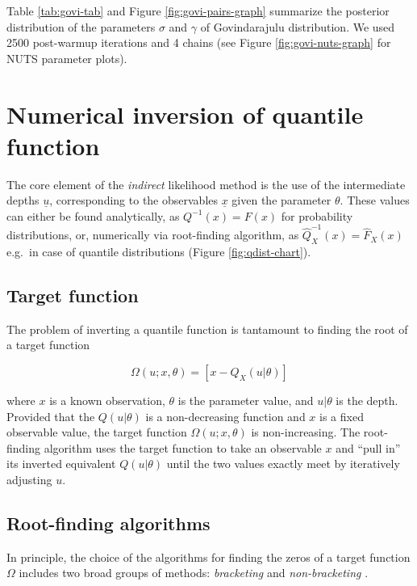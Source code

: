 \documentclass[
  12pt,
]{article}
\begin{document}
Table \ref{tab:govi-tab} and Figure \ref{fig:govi-pairs-graph} summarize the posterior distribution of the parameters \(\sigma\) and \(\gamma\) of Govindarajulu distribution. We used 2500 post-warmup iterations and 4 chains (see Figure \ref{fig:govi-nuts-graph} for NUTS parameter plots).

\hypertarget{numerical-inversion-of-quantile-function}{%
\section{Numerical inversion of quantile function}\label{numerical-inversion-of-quantile-function}}

The core element of the \emph{indirect} likelihood method is the use of the intermediate depths \(\underline{u}\), corresponding to the observables \(\underline{x}\) given the parameter \(\theta\). These values can either be found analytically, as \(Q^{-1}(x)=F(x)\) for probability distributions, or, numerically via root-finding algorithm, as \(\widehat{Q}^{-1}_X(x)=\widehat{F}_X(x)\) e.g.~in case of quantile distributions (Figure \ref{fig:qdist-chart}).

\hypertarget{target-function}{%
\subsection{Target function}\label{target-function}}

The problem of inverting a quantile function is tantamount to finding the root of a target function

\[
 \Omega(u;x,\theta)=[x-Q_X(u|\theta)]
\]

where \(x\) is a known observation, \(\theta\) is the parameter value, and \(u|\theta\) is the depth. Provided that the \(Q(u|\theta)\) is a non-decreasing function and \(x\) is a fixed observable value, the target function \(\Omega(u;x,\theta)\) is non-increasing. The root-finding algorithm uses the target function to take an observable \(x\) and ``pull in'' its inverted equivalent \(Q(u|\theta)\) until the two values exactly meet by iteratively adjusting \(u\).

\hypertarget{root-finding-algorithms}{%
\subsection{Root-finding algorithms}\label{root-finding-algorithms}}

In principle, the choice of the algorithms for finding the zeros of a target function \(\Omega\) includes two broad groups of methods: \emph{bracketing} and \emph{non-bracketing} \citep{atkinson2008IntroductionNumericalAnalysis, burden2011NumericalAnalysis}.
\end{document}
